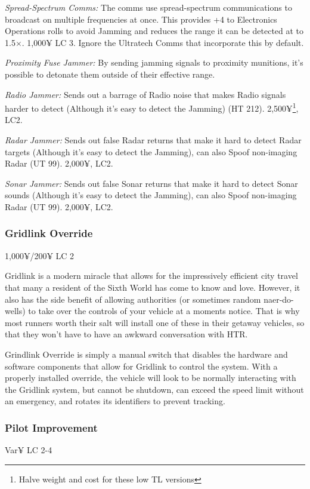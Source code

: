 \begin{multicols*}{2}
	\textit{Spread-Spectrum Comms:} The comms use spread-spectrum communications to broadcast on multiple frequencies at once. This provides +4 to Electronics Operations rolls to avoid Jamming and reduces the range it can be detected at to 1.5$\times$. 1,000¥ LC 3. Ignore the Ultratech Comms that incorporate this by default.
		
	\textit{Proximity Fuse Jammer:} By sending jamming signals to proximity munitions, it's possible to detonate them outside of their effective range. %
	
	\textit{Radio Jammer:} Sends out a barrage of Radio noise that makes Radio signals harder to detect (Although it's easy to detect the Jamming) (HT 212). 2,500¥\footnote{Halve weight and cost for these low TL versions}, LC2.
	
	\textit{Radar Jammer:} Sends out false Radar returns that make it hard to detect Radar targets (Although it's easy to detect the Jamming), can also Spoof non-imaging Radar (UT 99). 2,000¥, LC2.
	
	\textit{Sonar Jammer:} Sends out false Sonar returns that make it hard to detect Sonar sounds (Although it's easy to detect the Jamming), can also Spoof non-imaging Radar (UT 99). 2,000¥, LC2.
	
	\subsubsection{Gridlink Override}
	1,000¥/200¥ LC 2
	
	Gridlink is a modern miracle that allows for the impressively efficient city travel that many a resident of the Sixth World has come to know and love. However, it also has the side benefit of allowing authorities (or sometimes random naer-do-wells) to take over the controls of your vehicle at a moments notice. That is why most runners worth their salt will install one of these in their getaway vehicles, so that they won't have to have an awkward conversation with HTR.
	
	Grindlink Override is simply a manual switch that disables the hardware and software components that allow for Gridlink to control the system. With a properly installed override, the vehicle will look to be normally interacting with the Gridlink system, but cannot be shutdown, can exceed the speed limit without an emergency, and rotates its identifiers to prevent tracking.
	
	\subsubsection{Pilot Improvement}
	Var¥ LC 2-4
	

\end{multicols*}
